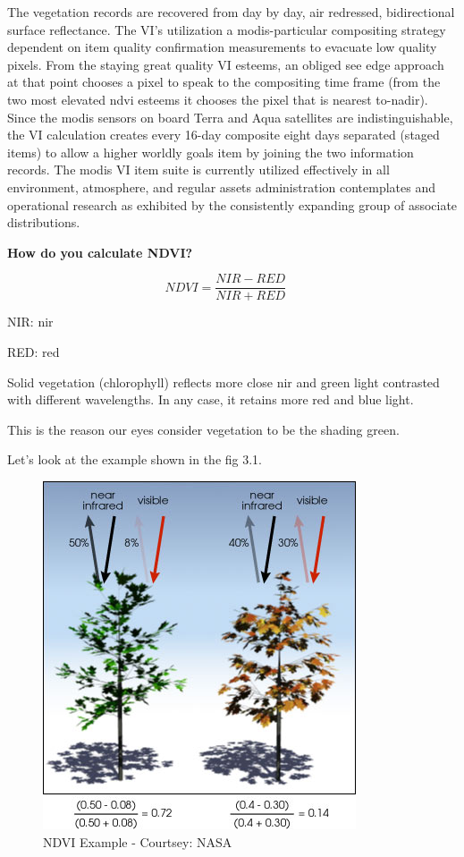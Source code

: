 The vegetation records are recovered from day by day, air redressed, bidirectional surface reflectance. The VI's utilization a \gls{modis}-particular compositing strategy dependent on item quality confirmation measurements to evacuate low quality pixels. From the staying great quality VI esteems, an obliged see edge approach at that point chooses a pixel to speak to the compositing time frame (from the two most elevated \gls{ndvi} esteems it chooses the pixel that is nearest to-nadir). Since the \gls{modis} sensors on board Terra and Aqua satellites are indistinguishable, the VI calculation creates every 16-day composite eight days separated (staged items) to allow a higher worldly goals item by joining the two information records. The \gls{modis} VI item suite is currently utilized effectively in all environment, atmosphere, and regular assets administration contemplates and operational research as exhibited by the consistently expanding group of associate distributions. \\

\centerline{\textbf{How do you calculate NDVI?}}

\textbf{\[ NDVI = \frac{NIR - RED}{NIR + RED} \ \ \ 
\ \ \]}

\centerline{NIR: \gls{nir}}
\centerline{RED: \gls{red}}

Solid vegetation (chlorophyll) reflects more close \gls{nir} and green light contrasted with different wavelengths. In any case, it retains more red and blue light. 

This is the reason our eyes consider vegetation to be the shading green.

Let's look at the example shown in the fig 3.1.

    \begin{figure}[H]
            \centering
            \includegraphics[width=0.5\linewidth]{figures/ch3/ndvi-example.png}
            \caption{\label{fig:level_list_screen} NDVI Example - Courtsey: NASA}
    \end{figure}

